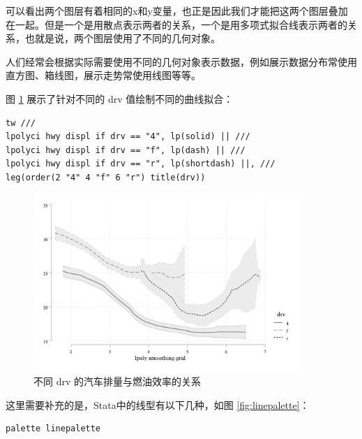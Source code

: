 \documentclass[]{ctexbook}
\begin{document}
可以看出两个图层有着相同的x和y变量，也正是因此我们才能把这两个图层叠加在一起。但是一个是用散点表示两者的关系，一个是用多项式拟合线表示两者的关系，也就是说，两个图层使用了不同的几何对象。

人们经常会根据实际需要使用不同的几何对象表示数据，例如展示数据分布常使用直方图、箱线图，展示走势常使用线图等等。

图 \ref{fig:lpolycibydrv} 展示了针对不同的 drv 值绘制不同的曲线拟合：

\begin{lstlisting}
tw ///
lpolyci hwy displ if drv == "4", lp(solid) || ///
lpolyci hwy displ if drv == "f", lp(dash) || ///
lpolyci hwy displ if drv == "r", lp(shortdash) ||, ///
leg(order(2 "4" 4 "f" 6 "r") title(drv))
\end{lstlisting}

\begin{figure}

{\centering \includegraphics[width=0.9\textwidth]{assets/lpolycibydrv} 

}

\caption{不同 drv 的汽车排量与燃油效率的关系}\label{fig:lpolycibydrv}
\end{figure}

这里需要补充的是，Stata中的线型有以下几种，如图 \ref{fig:linepalette}：

\begin{lstlisting}
palette linepalette
\end{lstlisting}
\end{document}
